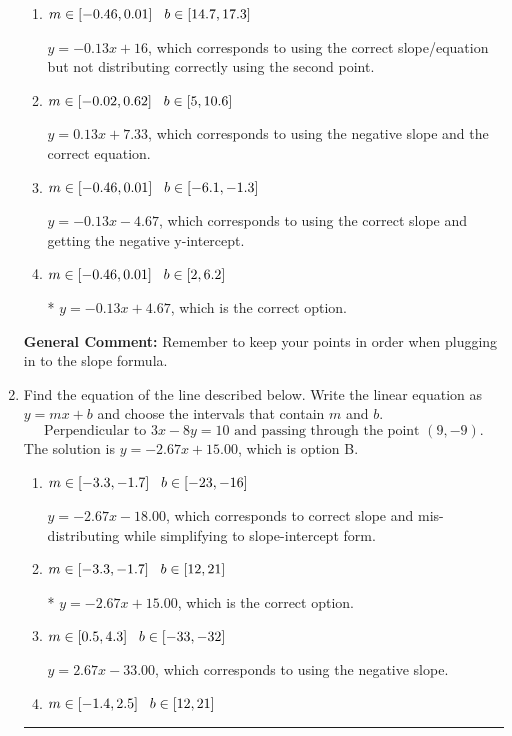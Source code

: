 \documentclass{extbook}[14pt]
\newcommand{\litem}[1]{\item #1

\rule{\textwidth}{0.4pt}}
\begin{document}
\begin{enumerate}
{\begin{enumerate}[label=\Alph*.]
 $y = -0.13x -1$, which corresponds to using the correct slope/equation but not distributing correctly using the first point.
\item \( m \in [-0.46, 0.01] \hspace*{3mm} b \in [14.7, 17.3] \)

 $y = -0.13x + 16$, which corresponds to using the correct slope/equation but not distributing correctly using the second point.
\item \( m \in [-0.02, 0.62] \hspace*{3mm} b \in [5, 10.6] \)

 $y = 0.13x + 7.33$, which corresponds to using the negative slope and the correct equation.
\item \( m \in [-0.46, 0.01] \hspace*{3mm} b \in [-6.1, -1.3] \)

 $y = -0.13x -4.67$, which corresponds to using the correct slope and getting the negative y-intercept.
\item \( m \in [-0.46, 0.01] \hspace*{3mm} b \in [2, 6.2] \)

* $y = -0.13x + 4.67$, which is the correct option.
\end{enumerate}

\textbf{General Comment:} Remember to keep your points in order when plugging in to the slope formula.
}
\litem{
Find the equation of the line described below. Write the linear equation as $ y=mx+b $ and choose the intervals that contain $m$ and $b$.
\[ \text{Perpendicular to } 3 x - 8 y = 10 \text{ and passing through the point } (9, -9). \]
The solution is \( y = -2.67x + 15.00 \), which is option B.\begin{enumerate}[label=\Alph*.]
\item \( m \in [-3.3, -1.7] \hspace*{3mm} b \in [-23, -16] \)

 $y = -2.67x - 18.00$, which corresponds to correct slope and mis-distributing while simplifying to slope-intercept form.
\item \( m \in [-3.3, -1.7] \hspace*{3mm} b \in [12, 21] \)

* $y = -2.67x + 15.00$, which is the correct option.
\item \( m \in [0.5, 4.3] \hspace*{3mm} b \in [-33, -32] \)

 $y = 2.67x - 33.00$, which corresponds to using the negative slope.
\item \( m \in [-1.4, 2.5] \hspace*{3mm} b \in [12, 21] \)


\end{enumerate}}
\end{enumerate}
\end{document}
